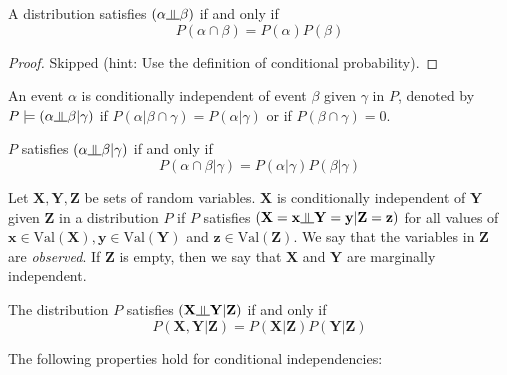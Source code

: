 \begin{prop}
A distribution satisfies $(\alpha \ind \beta)$ if and only if 
\begin{equation}
P(\alpha\cap\beta) = P(\alpha)P(\beta)
\end{equation}
\end{prop}
\begin{proof}
Skipped (hint: Use the definition of conditional probability).
\end{proof}
\begin{defn}
An event $\alpha$ is conditionally independent of event $\beta$ given $\gamma$ in $P$, denoted by $P \models (\alpha \ind\beta|\gamma)$ if $P(\alpha|\beta\cap\gamma) = P(\alpha|\gamma)$ or if $P(\beta\cap\gamma) = 0$.
\end{defn}
\begin{prop}
$P$ satisfies $(\alpha\ind\beta|\gamma)$ if and only if 
\begin{equation}
P(\alpha \cap\beta|\gamma) = P(\alpha|\gamma)P(\beta|\gamma)
\end{equation}
\end{prop}
\begin{defn}
Let $\mathbf{X, Y, Z}$ be sets of random variables. $\mathbf X$ is conditionally independent of $\mathbf Y$ given $\mathbf Z$ in a distribution $P$ if $P$ satisfies $(\mathbf X = \mathbf x \ind \mathbf Y = \mathbf y | \mathbf Z = \mathbf z)$ for all values of $\mathbf x \in \text{Val}(\mathbf X), \mathbf y \in \text{Val}(\mathbf Y)$ and $\mathbf z \in \text{Val}(\mathbf Z)$. We say that the variables in $\mathbf Z$ are \textit{observed}. If $\mathbf Z$ is empty, then we say that $\mathbf X$ and $\mathbf Y$ are marginally independent.
\end{defn}
\begin{prop}
The distribution $P$ satisfies $(\mathbf X \ind \mathbf Y|\mathbf Z)$ if and only if 
\begin{equation}
	P(\mathbf X,\mathbf Y|\mathbf Z) = P(\mathbf X|\mathbf Z)P(\mathbf Y|\mathbf Z)
\end{equation}
\end{prop}
The following properties hold for conditional independencies:
